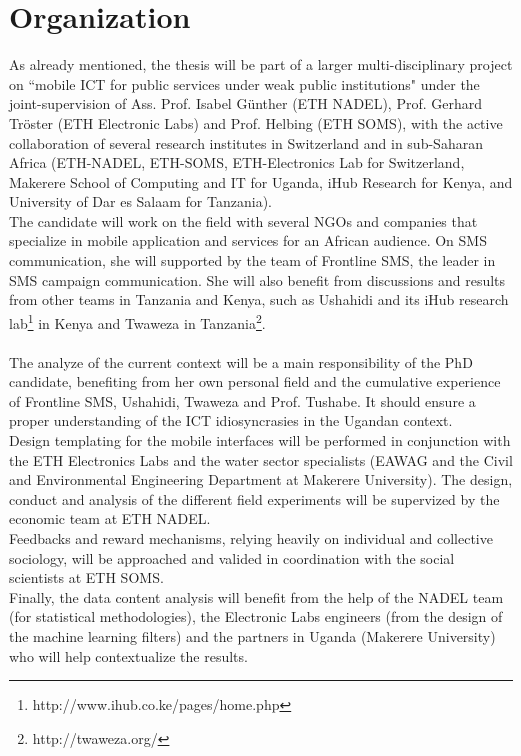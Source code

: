 \documentclass[11pt]{article}
\begin{document}
\section{Organization}\label{organization}
As already mentioned, the thesis will be part of a larger multi-disciplinary project on ``mobile ICT for public services under weak public institutions" under the joint-supervision of Ass. Prof. Isabel Günther (ETH NADEL), Prof. Gerhard Tröster (ETH Electronic Labs) and Prof. Helbing (ETH SOMS), with the active collaboration of several research institutes in Switzerland and in sub-Saharan Africa (ETH-­NADEL, ETH-­SOMS, ETH-­Electronics Lab for Switzerland, Makerere School of Computing and IT for Uganda, iHub Research for Kenya, and University of Dar es Salaam for Tanzania).  
\\
The candidate will work on the field with several NGOs and companies that specialize in mobile application and services for an African audience. On SMS communication, she will supported by the team of Frontline SMS, the leader in SMS campaign communication. She will also benefit from discussions and results from other teams in Tanzania and Kenya, such as Ushahidi and its iHub research lab\footnote{http://www.ihub.co.ke/pages/home.php} in Kenya and Twaweza in Tanzania\footnote{http://twaweza.org/}.
\\\\
The analyze of the current context will be a main responsibility of the PhD candidate, benefiting from her own personal field and the cumulative experience of Frontline SMS, Ushahidi, Twaweza and Prof. Tushabe. It should ensure a proper understanding of the ICT idiosyncrasies in the Ugandan context.
\\
Design templating for the mobile interfaces will be performed in conjunction with the ETH Electronics Labs and the water sector specialists (EAWAG and the Civil and Environmental Engineering Department at Makerere University). The design, conduct and analysis of the different field experiments will be supervized by the economic team at ETH NADEL.
\\
Feedbacks and reward mechanisms, relying heavily on individual and collective sociology, will be approached and valided in coordination with the social scientists at ETH SOMS.
\\
Finally, the data content analysis will benefit from the help of the NADEL team (for statistical methodologies), the Electronic Labs engineers (from the design of the machine learning filters) and the partners in Uganda (Makerere University) who will help contextualize the results.    
\end{document}
